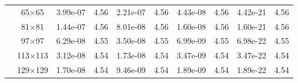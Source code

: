\begin{table}[H]
{\begin{tabular*}{\textwidth}{@{\extracolsep\fill}c|c|cc|cc|cc|cc@{}}
                & 65$\times$65 & 3.99e-07 & 4.56 & 2.21e-07 & 4.56 & 4.43e-08 & 4.56 & 4.42e-21 & 4.56 \\
                & 81$\times$81 & 1.44e-07 & 4.56 & 8.01e-08 & 4.56 & 1.60e-08 & 4.56 & 1.60e-21 & 4.56 \\
                & 97$\times$97 & 6.29e-08 & 4.55 & 3.50e-08 & 4.55 & 6.99e-09 & 4.55 & 6.98e-22 & 4.55 \\
                & 113$\times$113 & 3.12e-08 & 4.54 & 1.73e-08 & 4.54 & 3.47e-09 & 4.54 & 3.47e-22 & 4.54 \\
                & 129$\times$129 & 1.70e-08 & 4.54 & 9.46e-09 & 4.54 & 1.89e-09 & 4.54 & 1.89e-22 & 4.54 \\
                \bottomrule
            \end{tabular*}
	}{%
	\fdadospesquisa
	}
\end{table}